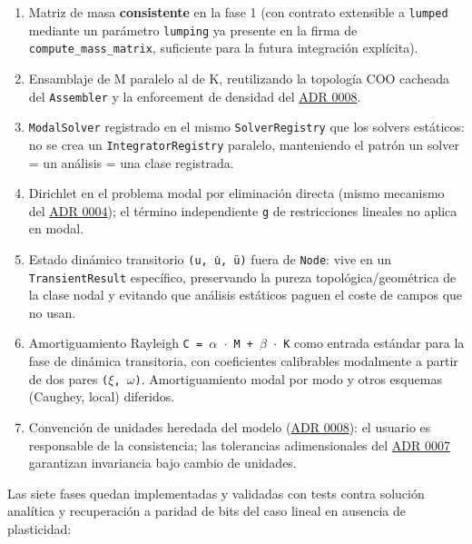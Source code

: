 \documentclass[11pt,oneside]{report}
\begin{document}
\begin{enumerate}
  \item Matriz de masa \textbf{consistente} en la fase 1 (con contrato extensible a \texttt{lumped} mediante un parámetro \texttt{lumping} ya presente en la firma de \texttt{compute\_\allowbreak{}mass\_\allowbreak{}matrix}, suficiente para la futura integración explícita).
  \item Ensamblaje de M paralelo al de K, reutilizando la topología COO cacheada del \texttt{Assembler} y la enforcement de densidad del \hyperref[adr:0008]{ADR 0008}.
  \item \texttt{ModalSolver} registrado en el mismo \texttt{SolverRegistry} que los solvers estáticos: no se crea un \texttt{IntegratorRegistry} paralelo, manteniendo el patrón \textquotedbl{}un solver = un análisis = una clase registrada\textquotedbl{}.
  \item Dirichlet en el problema modal por eliminación directa (mismo mecanismo del \hyperref[adr:0004]{ADR 0004}); el término independiente \texttt{g} de restricciones lineales no aplica en modal.
  \item Estado dinámico transitorio \texttt{(u, u̇, ü)} fuera de \texttt{Node}: vive en un \texttt{TransientResult} específico, preservando la pureza topológica/geométrica de la clase nodal y evitando que análisis estáticos paguen el coste de campos que no usan.
  \item Amortiguamiento Rayleigh \texttt{C = \ensuremath{\alpha} \ensuremath{\cdot} M + \ensuremath{\beta} \ensuremath{\cdot} K} como entrada estándar para la fase de dinámica transitoria, con coeficientes calibrables modalmente a partir de dos pares \texttt{(\ensuremath{\xi}, \ensuremath{\omega})}. Amortiguamiento modal por modo y otros esquemas (Caughey, local) diferidos.
  \item Convención de unidades heredada del modelo (\hyperref[adr:0008]{ADR 0008}): el usuario es responsable de la consistencia; las tolerancias adimensionales del \hyperref[adr:0007]{ADR 0007} garantizan invariancia bajo cambio de unidades.
\end{enumerate}

Las siete fases quedan implementadas y validadas con tests contra solución analítica y recuperación a paridad de bits del caso lineal en ausencia de plasticidad:
\end{document}
